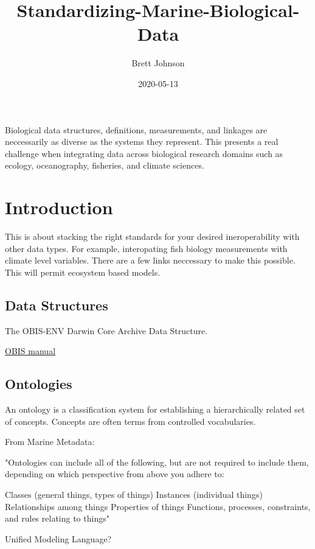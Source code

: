 \documentclass[]{book}
\title{Standardizing-Marine-Biological-Data}
\author{Brett Johnson}
\date{2020-05-13}
\begin{document}
\maketitle

{
\setcounter{tocdepth}{1}
\tableofcontents
}
Biological data structures, definitions, measurements, and linkages are neccessarily as diverse as the systems they represent. This presents a real challenge when integrating data across biological research domains such as ecology, oceanography, fisheries, and climate sciences.

\hypertarget{intro}{%
\chapter{Introduction}\label{intro}}

This is about stacking the right standards for your desired ineroperability with other data types. For example, interopating fish biology measurements with climate level variables. There are a few links neccessary to make this possible. This will permit ecosystem based models.

\hypertarget{data-structures}{%
\section{Data Structures}\label{data-structures}}

The OBIS-ENV Darwin Core Archive Data Structure.

\href{\%22https://obis.org/manual/\%22}{OBIS manual}

\hypertarget{ontologies}{%
\section{Ontologies}\label{ontologies}}

An ontology is a classification system for establishing a hierarchically related set of concepts. Concepts are often terms from controlled vocabularies.

From Marine Metadata:

"Ontologies can include all of the following, but are not required to include them, depending on which perspective from above you adhere to:

Classes (general things, types of things)
Instances (individual things)
Relationships among things
Properties of things
Functions, processes, constraints, and rules relating to things"

Unified Modeling Language?
\end{document}
